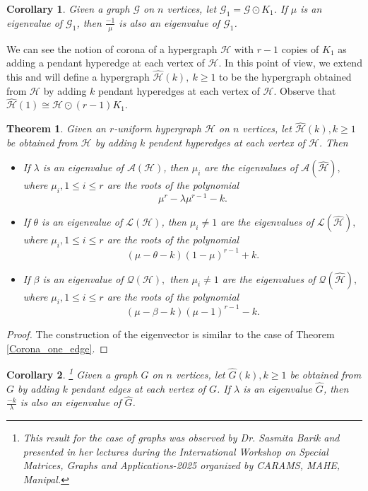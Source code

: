 \documentclass[10pt,a4paper]{article}
\newtheorem{corollary}{Corollary}[section]
\newtheorem{theorem}{Theorem}[section]
\begin{document}
	\begin{corollary}\cite{barik2007spectrum}
		Given a graph $\mathcal{G}$ on $n$ vertices, let $ \mathcal{G}_1 = \mathcal{G} \odot K_1$. 
		If $\mu$ is an eigenvalue of $\mathcal{G}_1$, then $\frac{-1}{\mu}$ is also an eigenvalue of $\mathcal{G}_1$.
	\end{corollary}
	
	
	We can see the notion of corona of a hypergraph $\mathcal{H}$ with $r-1$ copies of $K_1$ as adding a pendant hyperedge at each vertex of $\mathcal{H}$. In this point of view, we extend this and will define a hypergraph $\hat{\mathcal{H}}(k), ~ k \geq 1$ to be the hypergraph obtained from $\mathcal{H}$ by adding $k$ pendant hyperedges at each vertex of $\mathcal{H}$.
	Observe that $\hat{\mathcal{H}}(1) \cong \mathcal{H} \odot (r-1) K_1.$ 
	\begin{theorem}
		Given an $r$-uniform hypergraph $\mathcal{H}$ on $n$ vertices, let $\hat{\mathcal{H}}(k), k \geq 1$ be obtained from $\mathcal{H}$ by adding $k$ pendent hyperedges at each vertex of $\mathcal{H}$. Then
		\begin{itemize}
			\item  If $\lambda$ is an eigenvalue of $\mathcal{A}(\mathcal{H})$, 
			then $\mu_i$ are the eigenvalues of $\mathcal{A}(\hat{\mathcal{H}}),$
			where $\mu_i,1\leq i \leq r$ are the roots of the polynomial $$\mu^r - \lambda \mu^{r-1} -k.$$
			\item  If $\theta$ is an eigenvalue of $\mathcal{L}(\mathcal{H})$, then $\mu_i \neq 1$ are the eigenvalues of $\mathcal{L}(\hat{\mathcal{H}}),$ where $\mu_i, 1 \leq i \leq r$ are the roots of the polynomial  $$ (\mu-\theta-k)(1-\mu)^{r-1}+k.$$
			\item If $\beta$ is an eigenvalue of $\mathcal{Q}(\mathcal{H}),$ then $\mu_i \neq 1$ are the eigenvalues of $\mathcal{Q}(\hat{\mathcal{H}}),$ where $\mu_i, 1 \leq i \leq r$ are the roots of the polynomial     $$ (\mu-\beta-k)(\mu-1)^{r-1}-k.$$
		\end{itemize}
	\end{theorem}
	\begin{proof}
		The construction of the eigenvector is similar to the case of Theorem \ref{Corona_one_edge}.
	\end{proof}
	
	
	\begin{corollary}\footnote{This result for the case of graphs was observed by Dr. Sasmita Barik and presented in her lectures during the International Workshop on Special Matrices, Graphs and Applications-2025 organized by CARAMS, MAHE, Manipal.}
		Given a graph $G$ on $n$ vertices, let $\hat{G}(k), k \geq 1$ be obtained from $G$ by adding $k$ pendant edges at each vertex of $G$. If $\lambda$ is an eigenvalue $\hat{G}$, then $\frac{-k}{\lambda}$ is also an eigenvalue of $\hat{G}$.
	\end{corollary}
	
\end{document}
